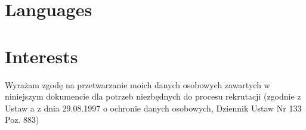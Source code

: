 \documentclass[11pt,a4paper,sans]{moderncv} %
\begin{document}



\section{Languages}



\section{Interests}

\renewcommand{\listitemsymbol}{-~} %



\footnotesize{
  \vfill
Wyrażam zgodę na przetwarzanie moich danych osobowych zawartych w niniejszym dokumencie dla potrzeb niezbędnych do procesu rekrutacji
(zgodnie z Ustaw a z dnia 29.08.1997 o ochronie danych osobowych, Dziennik Ustaw Nr 133 Poz. 883)
}
\end{document}
